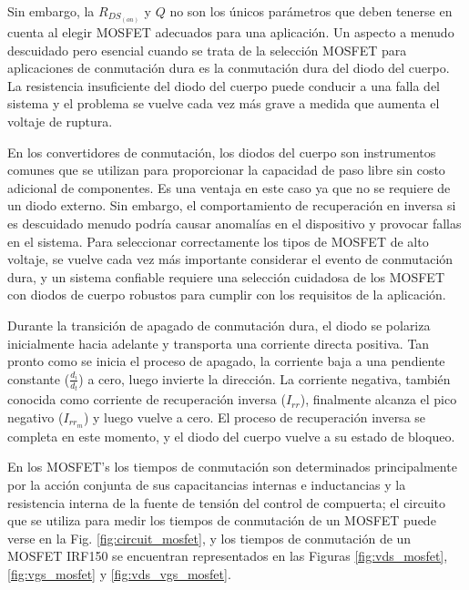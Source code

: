\documentclass[conference]{IEEEtran}
\begin{document}
Sin embargo, la $R_{DS_{(on)}}$ y $Q$ no son los únicos parámetros que deben tenerse en cuenta al elegir MOSFET adecuados para una aplicación. Un aspecto a menudo descuidado pero esencial cuando se trata de la selección MOSFET para aplicaciones de conmutación dura es la conmutación dura del diodo del cuerpo. La resistencia insuficiente del diodo del cuerpo puede conducir a una falla del sistema y el problema se vuelve cada vez más grave a medida que aumenta el voltaje de ruptura.

En los convertidores de conmutación, los diodos del cuerpo son instrumentos comunes que se utilizan para proporcionar la capacidad de paso libre sin costo adicional de componentes. Es una ventaja en este caso ya que no se requiere de un diodo externo. Sin embargo, el comportamiento de recuperación en inversa si es descuidado menudo podría causar anomalías en el dispositivo y provocar fallas en el sistema. Para seleccionar correctamente los tipos de MOSFET de alto voltaje, se vuelve cada vez más importante considerar el evento de conmutación dura, y un sistema confiable requiere una selección cuidadosa de los MOSFET con diodos de cuerpo robustos para cumplir con los requisitos de la aplicación.

Durante la transición de apagado de conmutación dura, el diodo se polariza inicialmente hacia adelante y transporta una corriente directa positiva. Tan pronto como se inicia el proceso de apagado, la corriente baja a una pendiente constante ($\frac{d_i}{d_t}$) a cero, luego invierte la dirección. La corriente negativa, también conocida como corriente de recuperación inversa ($I_{rr}$), finalmente alcanza el pico negativo ($I_{{rr}_{m}}$) y luego vuelve a cero. El proceso de recuperación inversa se completa en este momento, y el diodo del cuerpo vuelve a su estado de bloqueo.


En los MOSFET's los tiempos de conmutación son determinados principalmente por la acción conjunta de sus capacitancias internas e inductancias y la resistencia interna de la fuente de tensión del control de compuerta; el circuito que se utiliza para medir los tiempos de conmutación de un MOSFET puede verse en la Fig. \ref{fig:circuit_mosfet}, y los tiempos de conmutación de un MOSFET IRF150 se encuentran representados en las Figuras \ref{fig:vds_mosfet}, \ref{fig:vgs_mosfet} y \ref{fig:vds_vgs_mosfet}. 
\end{document}
